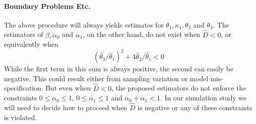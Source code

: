 \documentclass[12pt]{article}
\begin{document}
\paragraph{Boundary Problems Etc.}
The above procedure will always yields estimates for $\theta_1, \kappa_1, \theta_2$ and $\theta_3$.
The estimators of $\beta, \alpha_0$ and $\alpha_1$, on the other hand, do not exist when $\widehat{D} < 0$, or equivalently when 
\[
  (\widehat{\theta}_3 / \widehat{\theta}_1)^2 + 4\widehat{\theta}_2/\widehat{\theta}_1 < 0
\]
While the first term in this sum is always positive, the second can easily be negative.
This could result either from sampling variation or model mis-specification.
But even when $\widehat{D} < 0$, the proposed estimators do not enforce the constraints $0 \leq \alpha_0 \leq 1$, $0 \leq \alpha_1 \leq 1$ and $\alpha_0 + \alpha_1 < 1$.
In our simulation study we will need to decide how to proceed when $\widehat{D}$ is negative or any of these constraints is violated.
\end{document}
